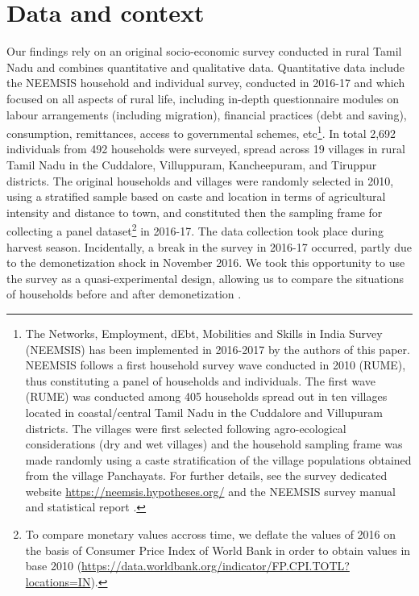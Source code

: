 \documentclass[a4paper, 11pt, onecolumn]{article}
\begin{document}
\section{Data and context}
\label{section:data}


Our findings rely on an original socio-economic survey conducted in rural Tamil Nadu and combines quantitative and qualitative data. 
Quantitative data include the NEEMSIS household and individual survey, conducted in 2016-17 and which focused on all aspects of rural life, including in-depth questionnaire modules on labour arrangements (including migration), financial practices (debt and saving), consumption, remittances, access to governmental schemes, etc\footnote{The Networks, Employment, dEbt, Mobilities and Skills in India Survey (NEEMSIS) has been implemented in 2016-2017 by the authors of this paper. NEEMSIS follows a first household survey wave conducted in 2010 (RUME), thus constituting a panel of households and individuals. The first wave (RUME) was conducted among 405 households spread out in ten villages located in coastal/central Tamil Nadu in the Cuddalore and Villupuram districts. The villages were first selected following agro-ecological considerations (dry and wet villages) and the household sampling frame was made randomly using a caste stratification of the village populations obtained from the village Panchayats. For further details, see the survey dedicated website \url{https://neemsis.hypotheses.org/} and the NEEMSIS survey manual and statistical report \citep{Nordman2017, Nordman2019}.}. In total 2,692 individuals from 492 households were surveyed, spread across 19 villages in rural Tamil Nadu in the Cuddalore, Villuppuram, Kancheepuram, and Tiruppur districts. The original households and villages were randomly selected in 2010, using a stratified sample based on caste and location in terms of agricultural intensity and distance to town, and constituted then the sampling frame for collecting a panel dataset\footnote{To compare monetary values accross time, we deflate the values of 2016 on the basis of Consumer Price Index of World Bank in order to obtain values in base 2010 (\url{https://data.worldbank.org/indicator/FP.CPI.TOTL?locations=IN}).} in 2016-17. 
The data collection took place during harvest season. 
Incidentally, a break in the survey in 2016-17 occurred, partly due to the demonetization shock in November 2016. 
We took this opportunity to use the survey as a quasi-experimental design, allowing us to compare the situations of households before and after demonetization \citep{Guerin2017, Hilger2020}. 
\end{document}
